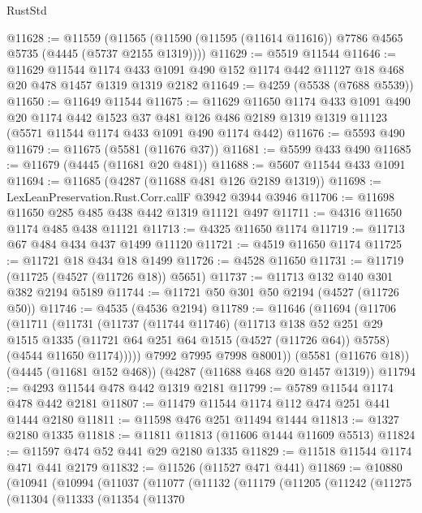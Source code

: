 \begin{lexlean}{RustStd}
\begin{coremodule}
{\begin{coremodule}
{{{{{{{{{{{{{{{{{{{{{{{{{{{{{{{{{{{{{{@11628 := @11559
    (@11565 (@11590 (@11595 (@11614 @11616)) @7786 @4565 @5735 (@4445 (@5737 @2155 @1319))))
@11629 := @5519 @11544
@11646 := @11629
    @11544
    @1174
    @433
    @1091
    @490
    @152
    @1174
    @442
    @11127
    @18
    @468
    @20
    @478
    @1457
    @1319
    @1319
    @2182
@11649 := @4259 (@5538 (@7688 @5539))
@11650 := @11649 @11544
@11675 := @11629
    @11650
    @1174
    @433
    @1091
    @490
    @20
    @1174
    @442
    @1523
    @37
    @481
    @126
    @486
    @2189
    @1319
    @1319
    @11123
    (@5571 @11544 @1174 @433 @1091 @490 @1174 @442)
@11676 := @5593 @490
@11679 := @11675 (@5581 (@11676 @37))
@11681 := @5599 @433 @490
@11685 := @11679 (@4445 (@11681 @20 @481))
@11688 := @5607 @11544 @433 @1091
@11694 := @11685 (@4287 (@11688 @481 @126 @2189 @1319))
@11698 := LexLeanPreservation.Rust.Corr.callF @3942 @3944 @3946
@11706 := @11698 @11650 @285 @485 @438 @442 @1319 @11121 @497
@11711 := @4316 @11650 @1174 @485 @438 @11121
@11713 := @4325 @11650 @1174
@11719 := @11713 @67 @484 @434 @437 @1499 @11120
@11721 := @4519 @11650 @1174
@11725 := @11721 @18 @434 @18 @1499
@11726 := @4528 @11650
@11731 := @11719 (@11725 (@4527 (@11726 @18)) @5651)
@11737 := @11713 @132 @140 @301 @382 @2194 @5189
@11744 := @11721 @50 @301 @50 @2194 (@4527 (@11726 @50))
@11746 := @4535 (@4536 @2194)
@11789 := @11646
    (@11694
      (@11706
        (@11711
          (@11731
            (@11737
              (@11744 @11746)
              (@11713
                @138
                @52
                @251
                @29
                @1515
                @1335
                (@11721 @64 @251 @64 @1515 (@4527 (@11726 @64)) @5758)
                (@4544 @11650 @1174)))))
        @7992
        @7995
        @7998
        @8001))
    (@5581 (@11676 @18))
    (@4445 (@11681 @152 @468))
    (@4287 (@11688 @468 @20 @1457 @1319))
@11794 := @4293 @11544 @478 @442 @1319 @2181
@11799 := @5789 @11544 @1174 @478 @442 @2181
@11807 := @11479 @11544 @1174 @112 @474 @251 @441 @1444 @2180
@11811 := @11598 @476 @251 @11494 @1444
@11813 := @1327 @2180 @1335
@11818 := @11811 @11813 (@11606 @1444 @11609 @5513)
@11824 := @11597 @474 @52 @441 @29 @2180 @1335
@11829 := @11518 @11544 @1174 @471 @441 @2179
@11832 := @11526 (@11527 @471 @441)
@11869 := @10880
    (@10941
      (@10994
        (@11037
          (@11077
            (@11132
              (@11179
                (@11205
                  (@11242
                    (@11275
                      (@11304
                        (@11333
                          (@11354
                            (@11370
}}}}}}}}}}}}}}}}}}}}}}}}}}}}}}}}}}}}}}
\end{coremodule}}
\end{coremodule}
\end{lexlean}
